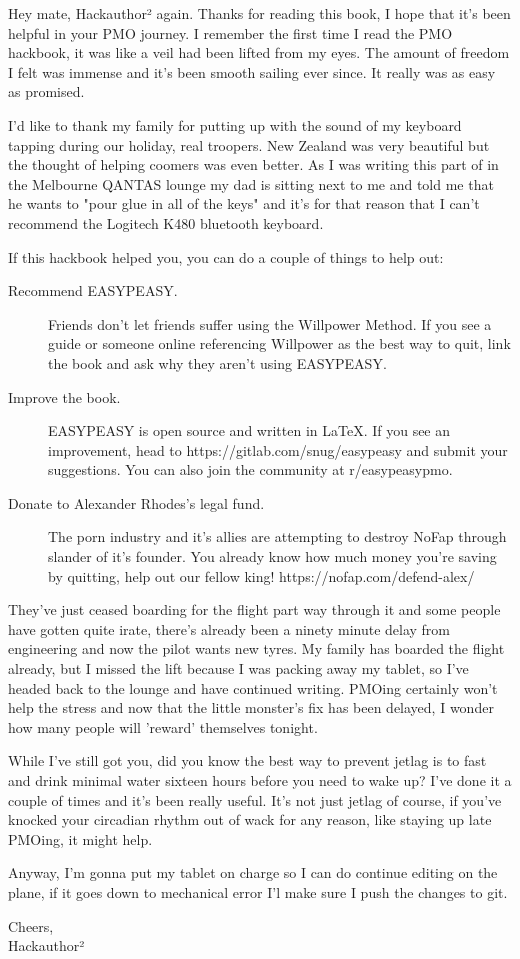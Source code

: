 \documentclass[easypeasy.tex]{subfiles}
\begin{document}
Hey mate, Hackauthor² again. Thanks for reading this book, I hope that it's been helpful in your PMO journey. I remember the first time I read the PMO hackbook, it was like a veil had been lifted from my eyes. The amount of freedom I felt was immense and it's been smooth sailing ever since. It really was as easy as promised.

I'd like to thank my family for putting up with the sound of my keyboard tapping during our holiday, real troopers. New Zealand was very beautiful but the thought of helping coomers was even better. As I was writing this part of in the Melbourne QANTAS lounge my dad is sitting next to me and told me that he wants to "pour glue in all of the keys" and it's for that reason that I can't recommend the Logitech K480 bluetooth keyboard.

If this hackbook helped you, you can do a couple of things to help out:
  \begin{description}
  \item [Recommend EASYPEASY.] Friends don't let friends suffer using the Willpower Method. If you see a guide or someone online referencing Willpower as the best way to quit, link the book and ask why they aren't using EASYPEASY.

  \item [Improve the book.] EASYPEASY is open source and written in LaTeX. If you see an improvement, head to https://gitlab.com/snug/easypeasy and submit your suggestions. You can also join the community at r/easypeasypmo.

  \item [Donate to Alexander Rhodes's legal fund.] The porn industry and it's allies are attempting to destroy NoFap through slander of it's founder. You already know how much money you're saving by quitting, help out our fellow king! https://nofap.com/defend-alex/
  \end{description}

They've just ceased boarding for the flight part way through it and some people have gotten quite irate, there's already been a ninety minute delay from engineering and now the pilot wants new tyres. My family has boarded the flight already, but I missed the lift because I was packing away my tablet, so I've headed back to the lounge and have continued writing. PMOing certainly won't help the stress and now that the little monster's fix has been delayed, I wonder how many people will 'reward' themselves tonight.

While I've still got you, did you know the best way to prevent jetlag is to fast and drink minimal water sixteen hours before you need to wake up? I've done it a couple of times and it's been really useful. It's not just jetlag of course, if you've knocked your circadian rhythm out of wack for any reason, like staying up late PMOing, it might help.

Anyway, I'm gonna put my tablet on charge so I can do continue editing on the plane, if it goes down to mechanical error I'l make sure I push the changes to git.

Cheers,\\
Hackauthor²
\end{document}
